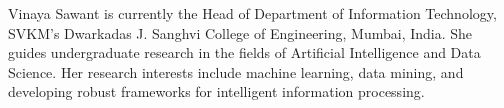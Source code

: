 \documentclass[lettersize,journal]{IEEEtran}
\begin{document}
\begin{IEEEbiographynophoto}{Vinaya Sawant}
is currently the Head of Department of Information Technology, SVKM's Dwarkadas J. Sanghvi College of Engineering, Mumbai, India. She guides undergraduate research in the fields of Artificial Intelligence and Data Science. Her research interests include machine learning, data mining, and developing robust frameworks for intelligent information processing.
\end{IEEEbiographynophoto}

\vfill
\end{document}

